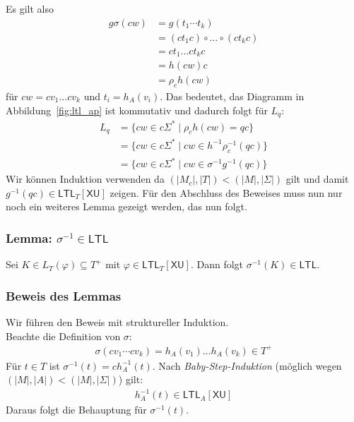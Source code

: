 \documentclass[12pt, german]{article}
\newcommand{\sigstern}{\Sigma^\ast}
\newcommand{\inv}{^{-1}}
\newcommand{\ltl}{\mathsf{LTL}}
\newcommand{\sX}{\mathsf{X}}
\newcommand{\sU}{\mathsf{U}}
\begin{document}
	Es gilt also 
		\begin{align*}
			g\sigma(cw) &= g(t_1\cdots t_k) \\ 
			&= (ct_1c)\circ\ldots \circ (ct_kc) \\
			&= ct_1 \ldots ct_kc\\
			&= h(cw)c \\ 
			&= \rho_ch(cw)
		\end{align*}
		für $cw = cv_1 \ldots cv_k$ und $t_i = h_A(v_i)$. 
		Das bedeutet, das Diagramm in Abbildung~\ref{fig:ltl_ap} ist kommutativ und dadurch folgt für $L_q$:
		\begin{align*}
				L_q &= \{cw \in c\sigstern \mid \rho_c h(cw) = qc\}\\ 
				&=\{cw \in c\sigstern \mid cw \in h\inv \rho_c\inv(qc)\} \\
				&= \{cw \in c\sigstern \mid cw \in \sigma\inv g\inv(qc)\}
		\end{align*}
		Wir können Induktion verwenden da $(|M_c|,|T|) < (|M|, |\Sigma|)$ gilt  und damit $g\inv(qc) \in \ltl_T[\sX\sU]$ zeigen. 
		Für den Abschluss des Beweises muss nun nur noch ein weiteres Lemma gezeigt werden, das nun folgt.

\subsubsection{Lemma:  $\sigma\inv \in \ltl$}
	Sei $K \in L_T(\varphi) \subseteq T^+$ mit $\varphi \in \ltl_T[\sX\sU]$.
	Dann folgt $\sigma\inv(K) \in \ltl$.		

\subsubsection{Beweis des Lemmas}
	Wir führen den Beweis mit struktureller Induktion. \\
	Beachte die Definition von $\sigma$:
	\begin{align*}
		\sigma(cv_1\cdots cv_k) = h_A(v_1)\ldots h_A(v_k) \in T^+
	\end{align*}
	Für $t \in T$ ist $\sigma\inv(t) = ch_A\inv(t)$. Nach \textit{Baby-Step-Induktion} (möglich wegen $(|M|,|A|) < (|M|,|\Sigma|)$) gilt: 
	\begin{align*}
		h_A\inv(t) \in \ltl_A[\sX\sU]
	\end{align*}
	Daraus folgt die Behauptung für $\sigma\inv(t)$.\newline
	
\end{document}
